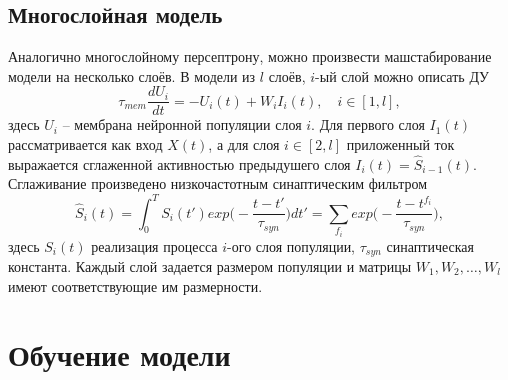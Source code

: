 \subsection{Многослойная модель}
\indent Аналогично многослойному персептрону, можно произвести машстабирование модели на несколько слоёв. В модели из $l$ слоёв, $i$-ый слой можно описать ДУ
\begin{equation} \label{eq:p2_2_mlayer}
\tau_{mem} \frac{dU_{i}}{dt} = -U_{i}(t) + W_{i} I_{i}(t),\quad i \in [1, l],
\end{equation}
здесь $U_{i}$ -- мембрана нейронной популяции слоя $i$. Для первого слоя $I_{1}(t)$ рассматривается как вход $X(t)$, а для слоя $i \in [2, l]$ приложенный ток выражается сглаженной активностью предыдушего слоя $I_{i}(t) = \hat S_{i-1}(t)$. Сглаживание произведено низкочастотным синаптическим фильтром
\begin{equation} \label{eq:p2_2_syn}
\hat S_{i}(t) = \int_{0}^{T} S_{i}(t') exp\Big(-\frac{t-t'}{\tau_{syn}}\Big)dt' = \sum_{f_{i}} exp\Big(-\frac{t-t^{f_{i}}}{\tau_{syn}}\Big),
\end{equation}
здесь $S_{i}(t)$ реализация процесса $i$-ого слоя популяции, $\tau_{syn}$ синаптическая константа. Каждый слой задается размером популяции и матрицы $W_{1}, W_{2}, \dots, W_{l}$ имеют соответствующие им размерности.

\section{Обучение модели} \label{sect2_3}
